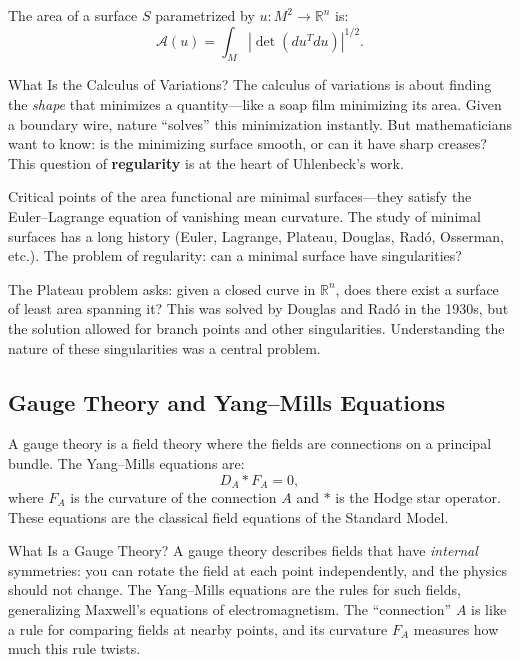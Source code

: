 The area of a surface $S$ parametrized by $u: M^2 \to \mathbb{R}^n$ is:
\[
\mathcal{A}(u) = \int_M |\det(du^T du)|^{1/2}.
\]

\begin{knowledgebridge}{What Is the Calculus of Variations?}
The calculus of variations is about finding the \emph{shape} that
minimizes a quantity---like a soap film minimizing its area. Given a
boundary wire, nature ``solves'' this minimization instantly. But
mathematicians want to know: is the minimizing surface smooth, or
can it have sharp creases? This question of \textbf{regularity} is
at the heart of Uhlenbeck's work.
\end{knowledgebridge}

Critical points of the area functional are minimal surfaces---they satisfy the Euler--Lagrange equation of vanishing mean curvature. The study of minimal surfaces has a long history (Euler, Lagrange, Plateau, Douglas, Rad\'o, Osserman, etc.). The problem of regularity: can a minimal surface have singularities?

The Plateau problem asks: given a closed curve in $\mathbb{R}^n$, does there exist a surface of least area spanning it? This was solved by Douglas and Rad\'o in the 1930s, but the solution allowed for branch points and other singularities. Understanding the nature of these singularities was a central problem.

\subsection{Gauge Theory and Yang--Mills Equations}

A gauge theory is a field theory where the fields are connections on a principal bundle. The Yang--Mills equations are:
\[
D_A * F_A = 0,
\]
where $F_A$ is the curvature of the connection $A$ and $*$ is the Hodge star operator. These equations are the classical field equations of the Standard Model.

\begin{primer}{What Is a Gauge Theory?}
A gauge theory describes fields that have \emph{internal} symmetries:
you can rotate the field at each point independently, and the physics
should not change. The Yang--Mills equations are the rules for such
fields, generalizing Maxwell's equations of electromagnetism. The
``connection'' $A$ is like a rule for comparing fields at nearby points,
and its curvature $F_A$ measures how much this rule twists.
\end{primer}

